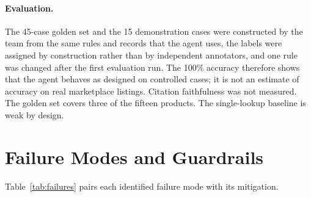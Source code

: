 \paragraph{Evaluation.} The 45-case golden set and the 15 demonstration cases were constructed by the
team from the same rules and records that the agent uses, the labels were assigned by construction
rather than by independent annotators, and one rule was changed after the first evaluation run. The
100\% accuracy therefore shows that the agent behaves as designed on controlled cases; it is not an
estimate of accuracy on real marketplace listings. Citation faithfulness was not measured. The golden
set covers three of the fifteen products. The single-lookup baseline is weak by design.

\section{Failure Modes and Guardrails}

Table~\ref{tab:failures} pairs each identified failure mode with its mitigation.

